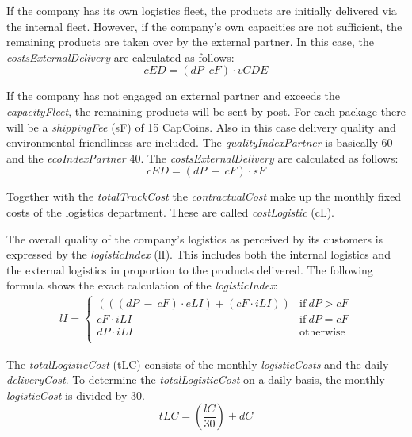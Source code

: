 If the company has its own logistics fleet, the products are initially delivered via the internal fleet. However, if the company's own capacities are not sufficient, the remaining products are taken over by the external partner. In this case, the \textit{costsExternalDelivery} are calculated as follows: 
\begin{equation}
\label{func:costExternalDelivery_partly}
    cED = ( dP – cF ) \cdot vCDE
\end{equation}

If the company has not engaged an external partner and exceeds the \textit{capacityFleet}, the remaining products will be sent by post. For each package there will be a \textit{shippingFee} (\gls{sF}) of 15 CapCoins. Also in this case delivery quality and environmental friendliness are included. The \textit{qualityIndexPartner} is basically 60 and the \textit{ecoIndexPartner} 40. The \textit{costsExternalDelivery} are calculated as follows:  
\begin{equation}
\label{func:costExternalDelivery_post}
    cED = ( dP \ - \ cF ) \cdot sF
\end{equation}

Together with the \textit{totalTruckCost} the \textit{contractualCost} make up the monthly fixed costs of the logistics department. These are called \textit{costLogistic} (\gls{cL}). 

The overall quality of the company's logistics as perceived by its customers is expressed by the \textit{logisticIndex} (\gls{lI}). This includes both the internal logistics and the external logistics in proportion to the products delivered. The following formula shows the exact calculation of the \textit{logisticIndex}:
\begin{equation}
\label{func:logisticIndex}
\begin{aligned}
lI = 
\begin{cases}
     ((( dP \ - \ cF) \cdot eLI ) + ( cF \cdot iLI )) & \text{if} ~dP > cF \\
     cF \cdot iLI & \text{if} ~dP = cF\\
     dP \cdot iLI & \text{otherwise} \\
\end{cases}
\end{aligned}
\end{equation}

The \textit{totalLogisticCost} (\gls{tLC}) consists of the monthly \textit{logisticCosts} and the daily \textit{deliveryCost}. To determine the \textit{totalLogisticCost} on a daily basis, the monthly \textit{logisticCost} is divided by 30. 
\begin{equation}
    tLC = (\frac{lC}{30}) + dC
\end{equation}
